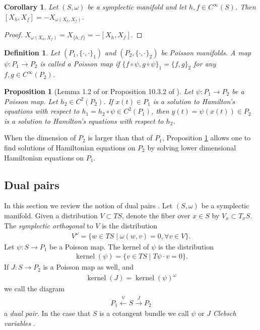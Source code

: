 \documentclass[12pt]{amsart}
\newtheorem{prop}[thm]{Proposition}
\newtheorem{cor}[thm]{Corollary}
\newtheorem{defn}[thm]{Definition}
\DeclareMathOperator{\kernel}{kernel}
\begin{document}
\begin{cor} \label{cor:Lie_hom}
  Let $(S,\omega)$ be a symplectic manifold
  and let $h,f \in C^{\infty}(S)$.
  Then $[X_h , X_f] = -X_{\omega(X_h,X_f) }$.
\end{cor}
\begin{proof}
  $X_{\omega(X_h,X_f)} = X_{ \{h,f\} } = -[X_h , X_f]$.
\end{proof}

\begin{defn}
  Let $(P_1, \{ \cdot , \cdot \}_1)$ and $(P_2, \{ \cdot , \cdot \}_2)$
  be Poisson manifolds.
  A map $\psi:P_1 \to P_2$ is called a
  \emph{Poisson map} if $\{ f \circ \psi , g \circ \psi \}_1 = \{ f , g \}_2$  for any $f,g \in C^{\infty}(P_2)$.
\end{defn}


\begin{prop}[Lemma 1.2 of \cite{Weinstein1983} or Proposition 10.3.2 of \cite{MandS}] \label{prop:Poisson_dynamics}
  Let $\psi:P_1 \to P_2$ be a Poisson map.
  Let $h_2 \in C^2(P_2)$.
  If $x(t) \in P_1$ is a solution to Hamilton's equations with respect
  to $h_1 = h_2 \circ \psi \in C^2(P_1)$, then $y(t) = \psi(x(t)) \in P_2$ is a solution
  to Hamilton's equations with respect to $h_2$.
\end{prop}

  When the dimension of $P_2$ is larger than that of $P_1$,
  Proposition \ref{prop:Poisson_dynamics} allows one to find solutions of
  Hamiltonian equations on $P_2$
  by solving lower dimensional Hamiltonian equations
  on $P_1$.
  \subsection{Dual pairs}
  In this section we review the notion of dual pairs
  \cite{MarsdenWeinstein1983,Weinstein1983,GayBalmazVizman2012}.
  Let $(S,\omega)$ be a symplectic manifold.
  Given a distribution $V \subset TS$, denote the fiber over 
  $x \in S$ by $V_x \subset T_x S$.
  The \emph{symplectic orthogonal} to $V$ is the distribution
  \begin{align*}
    V^\omega = \{ w \in TS \mid \omega( w , v ) = 0, \forall v \in V \}.
  \end{align*}
  Let $\psi:S \to P_1$ be a Poisson map.
  The kernel of $\psi$ is the distribution
  \begin{align*}
    \kernel(\psi) = \{ v \in TS \mid T\psi \cdot v  = 0 \}.
  \end{align*}
  If $J:S \to P_2$ is a Poisson map as well, and
  \begin{align*}
    \kernel(J) = \kernel(\psi)^\omega
  \end{align*}
  we call the diagram
  \begin{align*}
    P_1 \stackrel{\psi}{\leftarrow} S \stackrel{J}{\to} P_2
  \end{align*}
  a \emph{dual pair}.
  In the case that $S$ is a cotangent bundle we call $\psi$ or $J$
  \emph{Clebsch variables} \cite{MarsdenWeinstein1983}.
\end{document}
